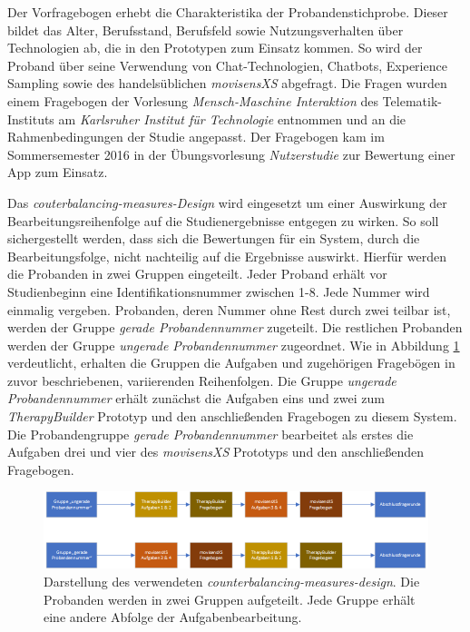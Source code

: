 Der Vorfragebogen erhebt die Charakteristika der Probandenstichprobe. Dieser bildet das Alter, Berufsstand, Berufsfeld sowie Nutzungsverhalten über Technologien ab, die in den Prototypen zum Einsatz kommen. So wird der Proband über seine Verwendung von Chat-Technologien, Chatbots, Experience Sampling sowie des handelsüblichen \emph{movisensXS} abgefragt. Die Fragen wurden einem Fragebogen der Vorlesung \emph{Mensch-Maschine Interaktion} des Telematik-Instituts am  \emph{Karlsruher Institut für Technologie} entnommen und an die Rahmenbedingungen der Studie angepasst. Der Fragebogen kam im Sommersemester 2016 in der Übungsvorlesung \emph{Nutzerstudie} zur Bewertung einer App zum Einsatz.

Das \emph{couterbalancing-measures-Design} wird eingesetzt um einer Auswirkung der Bearbeitungsreihenfolge auf die Studienergebnisse entgegen zu wirken. So soll sichergestellt werden, dass sich die Bewertungen für ein System, durch die Bearbeitungsfolge, nicht nachteilig auf die Ergebnisse auswirkt. Hierfür werden die Probanden in zwei Gruppen eingeteilt. Jeder Proband erhält vor Studienbeginn eine Identifikationsnummer zwischen 1-8. Jede Nummer wird einmalig vergeben. Probanden, deren Nummer ohne Rest durch zwei teilbar ist, werden der Gruppe \emph{gerade Probandennummer} zugeteilt. Die restlichen Probanden werden der Gruppe \emph{ungerade Probandennummer} zugeordnet. Wie in Abbildung \ref{counterbalancing} verdeutlicht, erhalten die Gruppen die Aufgaben und zugehörigen Fragebögen in zuvor beschriebenen, variierenden Reihenfolgen. Die Gruppe \emph{ungerade Probandennummer} erhält zunächst die Aufgaben eins und zwei zum \emph{TherapyBuilder} Prototyp und den anschließenden Fragebogen zu diesem System. Die Probandengruppe \emph{gerade Probandennummer} bearbeitet als erstes die Aufgaben drei und vier des \emph{movisensXS} Prototyps und den anschließenden Fragebogen. 

\begin{figure}[h]
\centering
\includegraphics[width=1\textwidth]{pictures/diagramme/counterbalancing-measure-design}
\caption{Darstellung des verwendeten \emph{counterbalancing-measures-design}. Die Probanden werden in zwei Gruppen aufgeteilt. Jede Gruppe erhält eine andere Abfolge der Aufgabenbearbeitung.}
\label{counterbalancing}
\end{figure}

